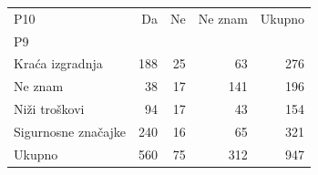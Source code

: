 \begin{tabular}{lrrrr}
\toprule
P10 & Da & Ne & Ne znam & Ukupno \\
P9 &  &  &  &  \\
\midrule
Kraća izgradnja & 188 & 25 & 63 & 276 \\
Ne znam & 38 & 17 & 141 & 196 \\
Niži troškovi & 94 & 17 & 43 & 154 \\
Sigurnosne značajke & 240 & 16 & 65 & 321 \\
Ukupno & 560 & 75 & 312 & 947 \\
\bottomrule
\end{tabular}
